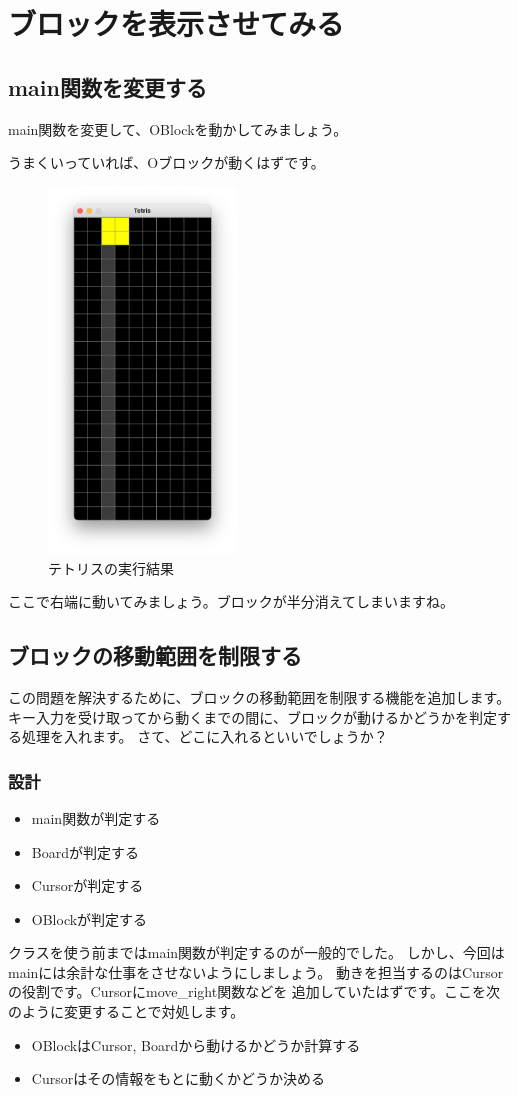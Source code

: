\documentclass[12pt, a4paper, dvipdfmx]{book}
\begin{document}
\section{ブロックを表示させてみる}
\subsection{main関数を変更する}
main関数を変更して、OBlockを動かしてみましょう。

\newpage
うまくいっていれば、Oブロックが動くはずです。
\begin{figure}[h]
  \centering
  \includegraphics[width=50mm]{TetrisCH7.png}
  \caption{テトリスの実行結果}
\end{figure}
ここで右端に動いてみましょう。ブロックが半分消えてしまいますね。

\subsection{ブロックの移動範囲を制限する}
この問題を解決するために、ブロックの移動範囲を制限する機能を追加します。
キー入力を受け取ってから動くまでの間に、ブロックが動けるかどうかを判定する処理を入れます。
さて、どこに入れるといいでしょうか？
\subsubsection{設計}
\begin{itemize}
  \item main関数が判定する
  \item Boardが判定する
  \item Cursorが判定する
  \item OBlockが判定する
\end{itemize}
クラスを使う前まではmain関数が判定するのが一般的でした。
しかし、今回はmainには余計な仕事をさせないようにしましょう。
動きを担当するのはCursorの役割です。Cursorにmove\_right関数などを
追加していたはずです。ここを次のように変更することで対処します。
\begin{itemize}
  \item OBlockはCursor, Boardから動けるかどうか計算する
  \item Cursorはその情報をもとに動くかどうか決める
\end{itemize}
\end{document}
